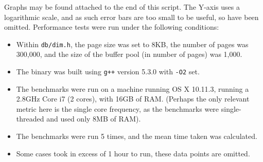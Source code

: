 Graphs may be found attached to the end of this script. The Y-axis uses a logarithmic scale, and as such error bars are too small to be useful, so have been omitted. Performance tests were run under the following conditions:

\begin{itemize}
  \item Within \texttt{db/dim.h}, the page size was set to 8KB, the number of pages was 300,000, and the size of the buffer pool (in number of pages) was 1,000.
  \item The binary was built using \texttt{g++} version 5.3.0 with \texttt{-O2} set.
  \item The benchmarks were run on a machine running OS X 10.11.3, running a 2.8GHz Core i7 (2 cores), with 16GB of RAM. (Perhaps the only relevant metric here is the single core frequency, as the benchmarks were single-threaded and used only 8MB of RAM).
  \item The benchmarks were run 5 times, and the mean time taken was calculated.
  \item Some cases took in excess of 1 hour to run, these data points are omitted.
\end{itemize}
